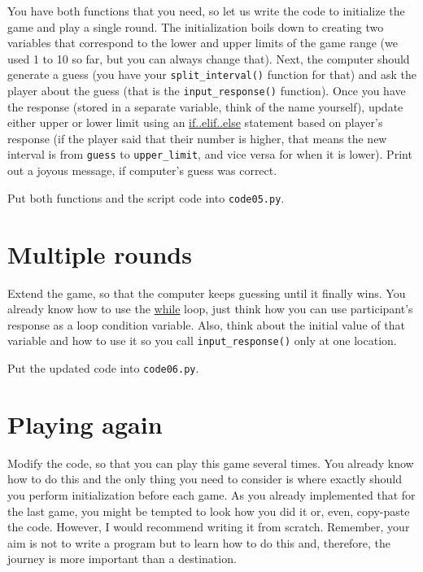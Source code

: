 \documentclass[
]{book}
\begin{document}
You have both functions that you need, so let us write the code to initialize the game and play a single round. The initialization boils down to creating two variables that correspond to the lower and upper limits of the game range (we used 1 to 10 so far, but you can always change that). Next, the computer should generate a guess (you have your \texttt{split\_interval()} function for that) and ask the player about the guess (that is the \texttt{input\_response()} function). Once you have the response (stored in a separate variable, think of the name yourself), update either upper or lower limit using an \protect\hyperlink{if-statement}{if..elif..else} statement based on player's response (if the player said that their number is higher, that means the new interval is from \texttt{guess} to \texttt{upper\_limit}, and vice versa for when it is lower). Print out a joyous message, if computer's guess was correct.

Put both functions and the script code into \texttt{code05.py}.

\hypertarget{multiple-rounds}{%
\section{Multiple rounds}\label{multiple-rounds}}

Extend the game, so that the computer keeps guessing until it finally wins. You already know how to use the \protect\hyperlink{while-loop}{while} loop, just think how you can use participant's response as a loop condition variable. Also, think about the initial value of that variable and how to use it so you call \texttt{input\_response()} only at one location.

Put the updated code into \texttt{code06.py}.

\hypertarget{playing-again}{%
\section{Playing again}\label{playing-again}}

Modify the code, so that you can play this game several times. You already know how to do this and the only thing you need to consider is where exactly should you perform initialization before each game. As you already implemented that for the last game, you might be tempted to look how you did it or, even, copy-paste the code. However, I would recommend writing it from scratch. Remember, your aim is not to write a program but to learn how to do this and, therefore, the journey is more important than a destination.
\end{document}
